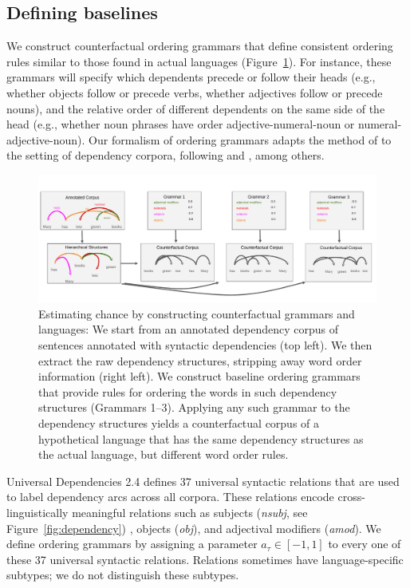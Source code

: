 \subsection{Defining baselines}

We construct counterfactual ordering grammars that define consistent ordering rules similar to those found in actual languages (Figure~\ref{fig:grammars}).
For instance, these grammars will specify which dependents precede or follow their heads (e.g., whether objects follow or precede verbs, whether adjectives follow or precede nouns), and the relative order of different dependents on the same side of the head (e.g., whether noun phrases have order adjective-numeral-noun or numeral-adjective-noun). Our formalism of ordering grammars adapts the method of \citet{gildea-optimizing-2007,gildea-grammars-2010,gildea-human-2015} to the setting of dependency corpora, following \citet{futrell-large-scale-2015} and \citet{hahn2020optimization}, among others.


\begin{figure}
\centering
\includegraphics[width=\textwidth]{figures-gdrive/counterfactual-languages.pdf}
\caption{Estimating chance by constructing counterfactual grammars and languages: We start from an annotated dependency corpus of sentences annotated with syntactic dependencies (top left). We then extract the raw dependency structures, stripping away word order information (right left).
We construct baseline ordering grammars that provide rules for ordering the words in such dependency structures (Grammars 1--3).
Applying any such grammar to the dependency structures yields a counterfactual corpus of a hypothetical language that has the same dependency structures as the actual language, but different word order rules.}\label{fig:grammars}
\end{figure}


Universal Dependencies 2.4 defines 37 universal syntactic relations that are used to label dependency arcs across all corpora.
These relations encode cross-linguistically meaningful relations such as subjects (\textit{nsubj}, see Figure~\ref{fig:dependency}) , objects (\textit{obj}), and adjectival modifiers (\textit{amod}).
We define ordering grammars by assigning a parameter $a_\tau \in [-1,1]$ to every one of these 37 universal syntactic relations.
Relations sometimes have language-specific subtypes; we do not distinguish these subtypes.

